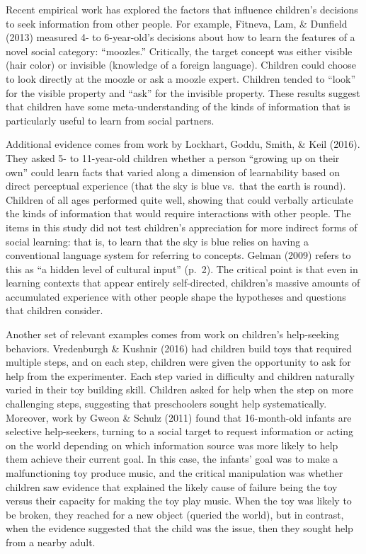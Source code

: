 \documentclass[oneside]{report}
\begin{document}
Recent empirical work has explored the factors that influence children's
decisions to seek information from other people. For example, Fitneva,
Lam, \& Dunfield (2013) measured 4- to 6-year-old's decisions about how
to learn the features of a novel social category: ``moozles.''
Critically, the target concept was either visible (hair color) or
invisible (knowledge of a foreign language). Children could choose to
look directly at the moozle or ask a moozle expert. Children tended to
``look'' for the visible property and ``ask'' for the invisible
property. These results suggest that children have some
meta-understanding of the kinds of information that is particularly
useful to learn from social partners.

Additional evidence comes from work by Lockhart, Goddu, Smith, \& Keil
(2016). They asked 5- to 11-year-old children whether a person ``growing
up on their own'' could learn facts that varied along a dimension of
learnability based on direct perceptual experience (that the sky is blue
vs.~that the earth is round). Children of all ages performed quite well,
showing that could verbally articulate the kinds of information that
would require interactions with other people. The items in this study
did not test children's appreciation for more indirect forms of social
learning: that is, to learn that the sky is blue relies on having a
conventional language system for referring to concepts. Gelman (2009)
refers to this as ``a hidden level of cultural input'' (p.~2). The
critical point is that even in learning contexts that appear entirely
self-directed, children's massive amounts of accumulated experience with
other people shape the hypotheses and questions that children consider.

Another set of relevant examples comes from work on children's
help-seeking behaviors. Vredenburgh \& Kushnir (2016) had children build
toys that required multiple steps, and on each step, children were given
the opportunity to ask for help from the experimenter. Each step varied
in difficulty and children naturally varied in their toy building skill.
Children asked for help when the step on more challenging steps,
suggesting that preschoolers sought help systematically. Moreover, work
by Gweon \& Schulz (2011) found that 16-month-old infants are selective
help-seekers, turning to a social target to request information or
acting on the world depending on which information source was more
likely to help them achieve their current goal. In this case, the
infants' goal was to make a malfunctioning toy produce music, and the
critical manipulation was whether children saw evidence that explained
the likely cause of failure being the toy versus their capacity for
making the toy play music. When the toy was likely to be broken, they
reached for a new object (queried the world), but in contrast, when the
evidence suggested that the child was the issue, then they sought help
from a nearby adult.
\end{document}
